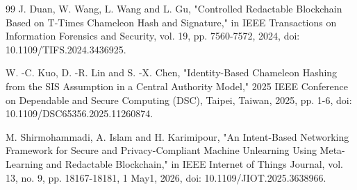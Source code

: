 \documentclass[lettersize,journal]{IEEEtran}
\begin{document}
\begin{thebibliography}{99}
J. Duan, W. Wang, L. Wang and L. Gu, "Controlled Redactable Blockchain Based on T-Times Chameleon Hash and Signature," in IEEE Transactions on Information Forensics and Security, vol. 19, pp. 7560-7572, 2024, doi: 10.1109/TIFS.2024.3436925. 

W. -C. Kuo, D. -R. Lin and S. -X. Chen, "Identity-Based Chameleon Hashing from the SIS Assumption in a Central Authority Model," 2025 IEEE Conference on Dependable and Secure Computing (DSC), Taipei, Taiwan, 2025, pp. 1-6, doi: 10.1109/DSC65356.2025.11260874.

M. Shirmohammadi, A. Islam and H. Karimipour, "An Intent-Based Networking Framework for Secure and Privacy-Compliant Machine Unlearning Using Meta-Learning and Redactable Blockchain," in IEEE Internet of Things Journal, vol. 13, no. 9, pp. 18167-18181, 1 May1, 2026, doi: 10.1109/JIOT.2025.3638966. 
\end{thebibliography}
\end{document}
